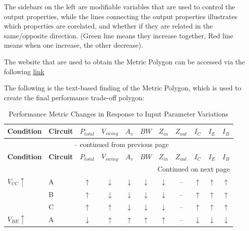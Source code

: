 \documentclass[11pt, a4paper]{article}
\begin{document}
The sidebars on the left are modifiable variables that are used to control the output properties, while the lines connecting the output properties illustrates which properties are corelated, and whether if they are related in the same/opposite direction. (Green line means they increase together, Red line means when one increase, the other decrease).

The website that are used to obtain the Metric Polygon can be accessed via the following \href{https://ec-assignment-simulation-by-limweijen.netlify.app/}{link}

The following is the text-based finding of the Metric Polygon, which is used to create the final performance trade-off polygon:

{
\renewcommand{\arraystretch}{1.2}
\small
\begin{longtable}{llccccccccc}
    \caption{Performance Metric Changes in Response to Input Parameter Variations}
    \label{tab:performance_metrics} \\
    \toprule
    \textbf{Condition} & \textbf{Circuit} & \textbf{$P_{total}$} & \textbf{$V_{swing}$} & \textbf{$A_v$} & \textbf{$BW$} & \textbf{$Z_{in}$} & \textbf{$Z_{out}$} & \textbf{$I_C$} & \textbf{$I_E$} & \textbf{$I_B$} \\
    \midrule
\endfirsthead
    \multicolumn{11}{c}{{\tablename\ \thetable{} -- continued from previous page}} \\
    \toprule
    \textbf{Condition} & \textbf{Circuit} & \textbf{$P_{total}$} & \textbf{$V_{swing}$} & \textbf{$A_v$} & \textbf{$BW$} & \textbf{$Z_{in}$} & \textbf{$Z_{out}$} & \textbf{$I_C$} & \textbf{$I_E$} & \textbf{$I_B$} \\
    \midrule
\endhead
    \midrule
    \multicolumn{11}{r}{{Continued on next page}} \\
\endfoot
    \bottomrule
\endlastfoot
    $V_{CC} \uparrow$
    & A & $\uparrow$ & $\downarrow$ & $\downarrow$ & $\downarrow$ & $\downarrow$ & -- & $\uparrow$ & $\uparrow$ & $\uparrow$ \\
    & B & $\uparrow$ & $\downarrow$ & $\downarrow$ & $\downarrow$ & $\downarrow$ & -- & $\uparrow$ & $\uparrow$ & $\uparrow$ \\
    & C & $\uparrow$ & $\uparrow$ & $\downarrow$ & $\downarrow$ & $\downarrow$ & -- & $\uparrow$ & $\uparrow$ & $\uparrow$ \\
    \midrule
    $V_{BE} \uparrow$
    & A & $\downarrow$ & $\uparrow$ & $\uparrow$ & $\uparrow$ & $\uparrow$ & -- & $\downarrow$ & $\downarrow$ & $\downarrow$ \\

\end{longtable}}
\end{document}
